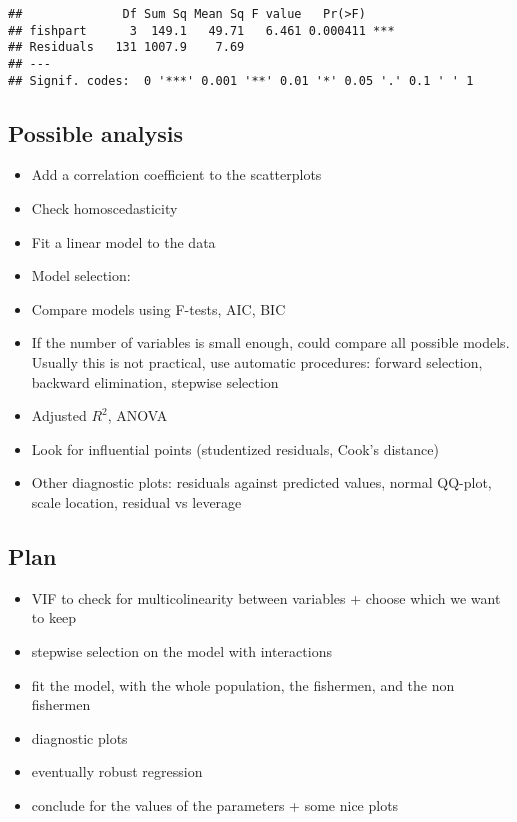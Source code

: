 \documentclass[12pt,]{article}
\begin{document}
\begin{verbatim}
##              Df Sum Sq Mean Sq F value   Pr(>F)    
## fishpart      3  149.1   49.71   6.461 0.000411 ***
## Residuals   131 1007.9    7.69                     
## ---
## Signif. codes:  0 '***' 0.001 '**' 0.01 '*' 0.05 '.' 0.1 ' ' 1
\end{verbatim}

\subsection{Possible analysis}\label{possible-analysis}

\begin{itemize}
\item
  Add a correlation coefficient to the scatterplots
\item
  Check homoscedasticity
\item
  Fit a linear model to the data
\item
  Model selection:
\item
  Compare models using F-tests, AIC, BIC
\item
  If the number of variables is small enough, could compare all possible
  models. Usually this is not practical, use automatic procedures:
  forward selection, backward elimination, stepwise selection
\item
  Adjusted \(R^2\), ANOVA
\item
  Look for influential points (studentized residuals, Cook's distance)
\item
  Other diagnostic plots: residuals against predicted values, normal
  QQ-plot, scale location, residual vs leverage
\end{itemize}

\subsection{Plan}\label{plan}

\begin{itemize}
\item
  VIF to check for multicolinearity between variables + choose which we
  want to keep
\item
  stepwise selection on the model with interactions
\item
  fit the model, with the whole population, the fishermen, and the non
  fishermen
\item
  diagnostic plots
\item
  eventually robust regression
\item
  conclude for the values of the parameters + some nice plots
\end{itemize}
\end{document}
